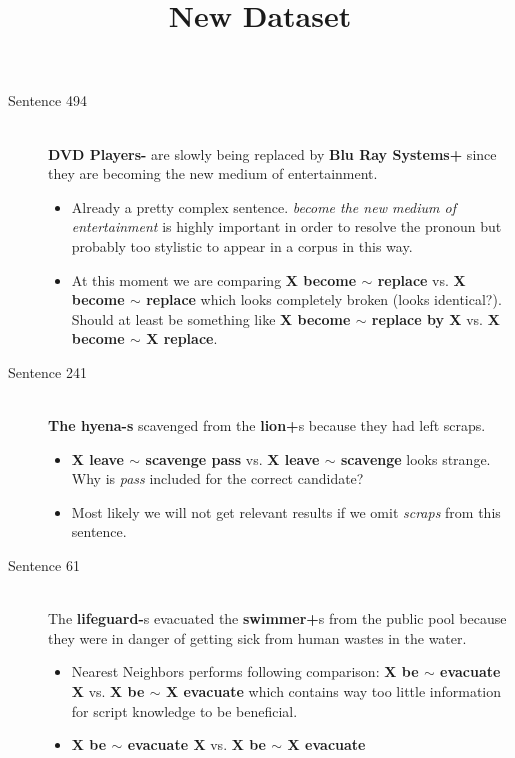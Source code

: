 \documentclass{scrartcl}
\begin{document}
\begin{description}
  \item[Sentence 494] \hfill \\
  {\bf DVD Players-} are slowly being replaced by {\bf Blu Ray Systems+} since they are becoming the new medium of entertainment.
  \begin{itemize}
  	\item Already a pretty complex sentence. {\it become the new medium of entertainment} is highly important in order to resolve the pronoun but probably too stylistic to appear in a corpus in this way.
  	\item At this moment we are comparing {\bf X become $\sim$ replace} vs. {\bf X become $\sim$ replace} which looks completely broken (looks identical?). Should at least be something like {\bf X become $\sim$ replace by X} vs. {\bf X become $\sim$ X replace}.
  \end{itemize}

  \item[Sentence 241] \hfill \\
  {\bf The hyena-s} scavenged from the {\bf lion+}s because they had left scraps.
  \begin{itemize}
  	\item {\bf X leave $\sim$ scavenge pass} vs. {\bf X leave $\sim$ scavenge} looks strange. Why is {\it pass} included for the correct candidate?
  	\item Most likely we will not get relevant results if we omit {\it scraps} from this sentence.
  \end{itemize}

\newpage
\begin{center}
	\title{{\large New Dataset}}
\end{center}

  \item[Sentence 61] \hfill \\
  The {\bf lifeguard-}s evacuated the {\bf swimmer+}s from the public pool because they were in danger of getting sick from human wastes in the water.
  \begin{itemize}
  	\item Nearest Neighbors performs following comparison: {\bf X be $\sim$ evacuate X} vs. {\bf X be $\sim$ X evacuate} which contains way too little information for script knowledge to be beneficial.
  	\item {\bf X be $\sim$ evacuate X} vs. {\bf X be $\sim$ X evacuate}
  \end{itemize}


\end{description}

\end{document}
